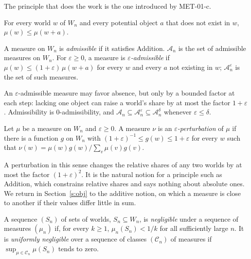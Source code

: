 \documentclass{situationist-preprint}
\begin{document}
The principle that does the work is the one introduced by MET-01-c.

\begin{principle}[Addition]\label{p:add}
For every world $w$ of $W_n$ and every potential object $a$ that does not exist in $w$, $\mu(w) \leq \mu(w + a)$.
\end{principle}

\begin{definition}\label{d:adm}
A measure on $W_n$ is \emph{admissible} if it satisfies Addition. $\mathcal{A}_n$ is the set of admissible measures on $W_n$. For $\varepsilon \geq 0$, a measure is \emph{$\varepsilon$-admissible} if $\mu(w) \leq (1 + \varepsilon)\,\mu(w + a)$ for every $w$ and every $a$ not existing in $w$; $\mathcal{A}_n^{\varepsilon}$ is the set of such measures.
\end{definition}

An $\varepsilon$-admissible measure may favor absence, but only by a bounded factor at each step: lacking one object can raise a world's share by at most the factor $1 + \varepsilon$. Admissibility is $0$-admissibility, and $\mathcal{A}_n \subseteq \mathcal{A}_n^{\varepsilon} \subseteq \mathcal{A}_n^{\delta}$ whenever $\varepsilon \leq \delta$.

\begin{definition}\label{d:pert}
Let $\mu$ be a measure on $W_n$ and $\varepsilon \geq 0$. A measure $\nu$ is an \emph{$\varepsilon$-perturbation} of $\mu$ if there is a function $g$ on $W_n$ with $(1+\varepsilon)^{-1} \leq g(w) \leq 1 + \varepsilon$ for every $w$ such that $\nu(w) = \mu(w) g(w) / \sum_v \mu(v) g(v)$.
\end{definition}

A perturbation in this sense changes the relative shares of any two worlds by at most the factor $(1+\varepsilon)^2$. It is the natural notion for a principle such as Addition, which constrains relative shares and says nothing about absolute ones. We return in Section~\ref{s:obj} to the additive notion, on which a measure is close to another if their values differ little in sum.

\begin{definition}\label{d:negl}
A sequence $(S_n)$ of sets of worlds, $S_n \subseteq W_n$, is \emph{negligible} under a sequence of measures $(\mu_n)$ if, for every $k \geq 1$, $\mu_n(S_n) < 1/k$ for all sufficiently large $n$. It is \emph{uniformly negligible} over a sequence of classes $(\mathcal{C}_n)$ of measures if $\sup_{\mu \in \mathcal{C}_n} \mu(S_n)$ tends to zero.
\end{definition}
\end{document}
